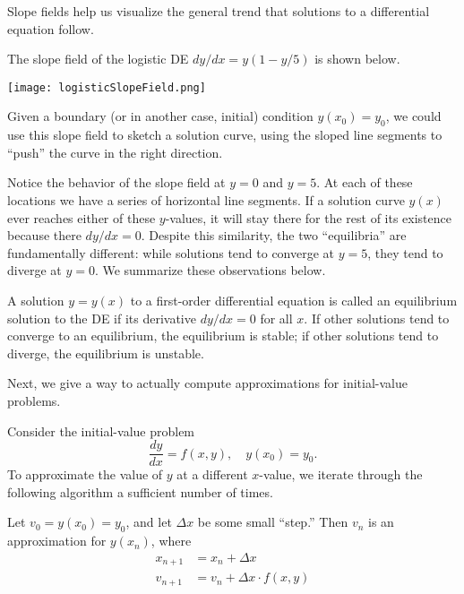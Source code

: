 \documentclass[../m082main.tex]{subfiles}
\begin{document}
Slope fields help us visualize the general trend that solutions to a differential equation follow.

\begin{example}
    The slope field of the logistic DE $dy / dx = y\left( 1 - y / 5 \right)$ is shown below.
    \begin{center}
        \texttt{[image: logisticSlopeField.png]}
    \end{center}
    Given a boundary (or in another case, initial) condition $y(x_0) = y_0$, we could use this slope field to sketch a solution curve, using the sloped line segments to ``push'' the curve in the right direction.
\end{example}

Notice the behavior of the slope field at $y = 0$ and $y = 5$.
At each of these locations we have a series of horizontal line segments.
If a solution curve $y(x)$ ever reaches either of these $y$-values, it will stay there for the rest of its existence because there $dy / dx = 0$.
Despite this similarity, the two ``equilibria'' are fundamentally different: while solutions tend to converge at $y = 5$, they tend to diverge at $y = 0$.
We summarize these observations below.

\begin{definition}
    A solution $y = y(x)$ to a first-order differential equation is called an equilibrium solution to the DE if its derivative $dy / dx = 0$ for all $x$.
    If other solutions tend to converge to an equilibrium, the equilibrium is stable; if other solutions tend to diverge, the equilibrium is unstable.
\end{definition}

Next, we give a way to actually compute approximations for initial-value problems.

\begin{definition}
    Consider the initial-value problem
    \[ \frac{dy}{dx} = f(x, y), \quad y(x_0) = y_0. \]
    To approximate the value of $y$ at a different $x$-value, we iterate through the following algorithm a sufficient number of times.

    Let $v_0 = y(x_0) = y_0$, and let $\Delta x$ be some small ``step.''
    Then $v_n$ is an approximation for $y(x_n)$, where
    \begin{align*}
        x_{n+1} &= x_n + \Delta x \\
        v_{n+1} &= v_n + \Delta x \cdot f(x, y)
    \end{align*}
    
\end{definition}
\end{document}
